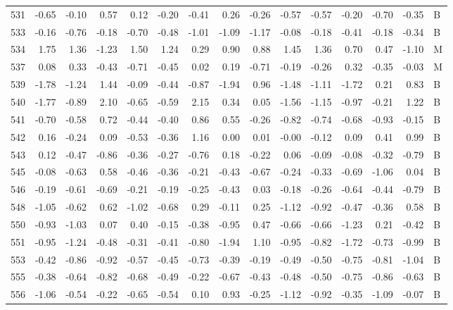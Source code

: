 \begin{table}[ht]
\begin{tabular}{rrrrrrrrrrrrrrl}
  531 & -0.65 & -0.10 & 0.57 & 0.12 & -0.20 & -0.41 & 0.26 & -0.26 & -0.57 & -0.57 & -0.20 & -0.70 & -0.35 & B \\ 
  533 & -0.16 & -0.76 & -0.18 & -0.70 & -0.48 & -1.01 & -1.09 & -1.17 & -0.08 & -0.18 & -0.41 & -0.18 & -0.34 & B \\ 
  534 & 1.75 & 1.36 & -1.23 & 1.50 & 1.24 & 0.29 & 0.90 & 0.88 & 1.45 & 1.36 & 0.70 & 0.47 & -1.10 & M \\ 
  537 & 0.08 & 0.33 & -0.43 & -0.71 & -0.45 & 0.02 & 0.19 & -0.71 & -0.19 & -0.26 & 0.32 & -0.35 & -0.03 & M \\ 
  539 & -1.78 & -1.24 & 1.44 & -0.09 & -0.44 & -0.87 & -1.94 & 0.96 & -1.48 & -1.11 & -1.72 & 0.21 & 0.83 & B \\ 
  540 & -1.77 & -0.89 & 2.10 & -0.65 & -0.59 & 2.15 & 0.34 & 0.05 & -1.56 & -1.15 & -0.97 & -0.21 & 1.22 & B \\ 
  541 & -0.70 & -0.58 & 0.72 & -0.44 & -0.40 & 0.86 & 0.55 & -0.26 & -0.82 & -0.74 & -0.68 & -0.93 & -0.15 & B \\ 
  542 & 0.16 & -0.24 & 0.09 & -0.53 & -0.36 & 1.16 & 0.00 & 0.01 & -0.00 & -0.12 & 0.09 & 0.41 & 0.99 & B \\ 
  543 & 0.12 & -0.47 & -0.86 & -0.36 & -0.27 & -0.76 & 0.18 & -0.22 & 0.06 & -0.09 & -0.08 & -0.32 & -0.79 & B \\ 
  545 & -0.08 & -0.63 & 0.58 & -0.46 & -0.36 & -0.21 & -0.43 & -0.67 & -0.24 & -0.33 & -0.69 & -1.06 & 0.04 & B \\ 
  546 & -0.19 & -0.61 & -0.69 & -0.21 & -0.19 & -0.25 & -0.43 & 0.03 & -0.18 & -0.26 & -0.64 & -0.44 & -0.79 & B \\ 
  548 & -1.05 & -0.62 & 0.62 & -1.02 & -0.68 & 0.29 & -0.11 & 0.25 & -1.12 & -0.92 & -0.47 & -0.36 & 0.58 & B \\ 
  550 & -0.93 & -1.03 & 0.07 & 0.40 & -0.15 & -0.38 & -0.95 & 0.47 & -0.66 & -0.66 & -1.23 & 0.21 & -0.42 & B \\ 
  551 & -0.95 & -1.24 & -0.48 & -0.31 & -0.41 & -0.80 & -1.94 & 1.10 & -0.95 & -0.82 & -1.72 & -0.73 & -0.99 & B \\ 
  553 & -0.42 & -0.86 & -0.92 & -0.57 & -0.45 & -0.73 & -0.39 & -0.19 & -0.49 & -0.50 & -0.75 & -0.81 & -1.04 & B \\ 
  555 & -0.38 & -0.64 & -0.82 & -0.68 & -0.49 & -0.22 & -0.67 & -0.43 & -0.48 & -0.50 & -0.75 & -0.86 & -0.63 & B \\ 
  556 & -1.06 & -0.54 & -0.22 & -0.65 & -0.54 & 0.10 & 0.93 & -0.25 & -1.12 & -0.92 & -0.35 & -1.09 & -0.07 & B \\ 

\end{tabular}
\end{table}

